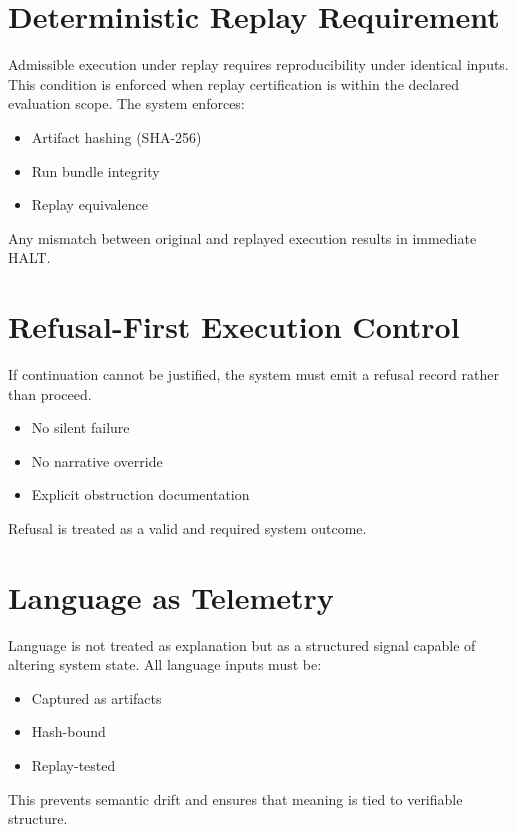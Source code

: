 \documentclass[11pt]{article}
\begin{document}
\section{Deterministic Replay Requirement}

Admissible execution under replay requires reproducibility under identical inputs. This condition is enforced when replay certification is within the declared evaluation scope. The system enforces:

\begin{itemize}
    \item Artifact hashing (SHA-256) \cite{fips1804}
    \item Run bundle integrity
    \item Replay equivalence
\end{itemize}

Any mismatch between original and replayed execution results in immediate HALT.

\section{Refusal-First Execution Control}

If continuation cannot be justified, the system must emit a refusal record rather than proceed.

\begin{itemize}
    \item No silent failure
    \item No narrative override
    \item Explicit obstruction documentation
\end{itemize}

Refusal is treated as a valid and required system outcome.

\section{Language as Telemetry}

Language is not treated as explanation but as a structured signal capable of altering system state. All language inputs must be:

\begin{itemize}
    \item Captured as artifacts
    \item Hash-bound
    \item Replay-tested
\end{itemize}

This prevents semantic drift and ensures that meaning is tied to verifiable structure.
\end{document}
